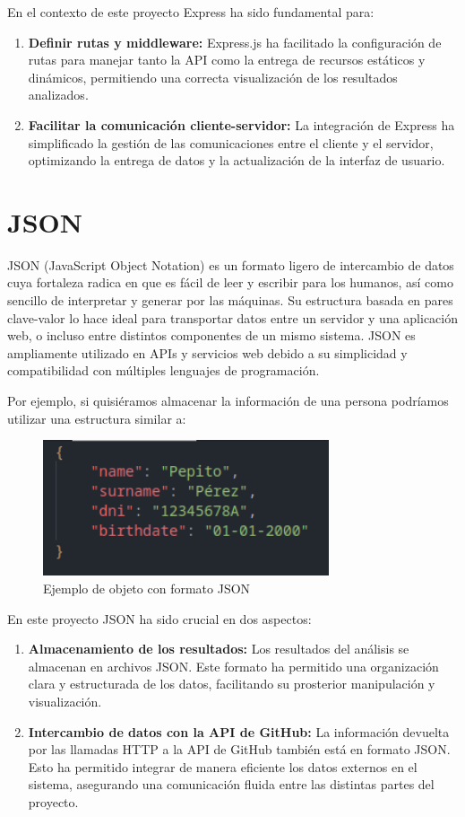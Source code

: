 \documentclass[a4paper, 12pt]{book}
\begin{document}
En el contexto de este proyecto Express ha sido fundamental para:

\begin{enumerate}
    \item \textbf{Definir rutas y middleware:} Express.js ha facilitado la configuración de rutas para manejar tanto la API como la entrega de recursos estáticos y dinámicos, permitiendo una correcta visualización de los resultados analizados.
    \item \textbf{Facilitar la comunicación cliente-servidor:} La integración de Express ha simplificado la gestión de las comunicaciones entre el cliente y el servidor, optimizando la entrega de datos y la actualización de la interfaz de usuario.
\end{enumerate}

\section{JSON}
JSON (JavaScript Object Notation) es un formato ligero de intercambio de datos cuya fortaleza radica en que es fácil de leer y escribir para los humanos, así como sencillo de interpretar y generar por las máquinas. Su estructura basada en pares clave-valor lo hace ideal para transportar datos entre un servidor y una aplicación web, o incluso entre distintos componentes de un mismo sistema. JSON es ampliamente utilizado en APIs y servicios web debido a su simplicidad y compatibilidad con múltiples lenguajes de programación.

Por ejemplo, si quisiéramos almacenar la información de una persona podríamos utilizar una estructura similar a:

\begin{figure} [h]
    \centering
    \includegraphics[height=4cm, keepaspectratio]{img/example_json.png}
    \caption{Ejemplo de objeto con formato JSON}
    \label{fig:enter-label}
\end{figure}

En este proyecto JSON ha sido crucial en dos aspectos:

\begin{enumerate}
    \item \textbf{Almacenamiento de los resultados:} Los resultados del análisis se almacenan en archivos JSON. Este formato ha permitido una organización clara y estructurada de los datos, facilitando su prosterior manipulación y visualización.
    \item \textbf{Intercambio de datos con la API de GitHub:} La información devuelta por las llamadas HTTP a la API de GitHub también está en formato JSON. Esto ha permitido integrar de manera eficiente los datos externos en el sistema, asegurando una comunicación fluida entre las distintas partes del proyecto.
\end{enumerate}
\end{document}
